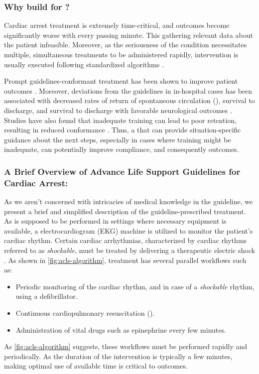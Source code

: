 \subsubsection{Why build \CDSSs{} for \ACLS{}?}

Cardiac arrest treatment is extremely time-critical, and outcomes
become significantly worse with every passing minute. This
gathering relevant data about the patient infeasible. Moreover, as
the seriousness of the condition necessitates multiple, simultaneous treatments
to be administered rapidly, intervention is usually executed following
standardized \ACLS{} algorithms \cite{ACLSWikiEntry}.

Prompt \ACLS{} guidelines-conformant treatment has been
shown to improve patient outcomes \cite{HonarmandResuscitation18}.
Moreover, deviations from the guidelines in in-hospital cases has been
associated with decreased rates of return of spontaneous circulation (\ROSC{}),
survival to discharge, and survival to discharge with favorable neurological
outcomes \cite{CrowleyResuscitation20}. Studies have also found that
inadequate \ACLS{} training can lead to poor retention, resulting
in reduced \ACLS{} conformance \cite{KiddJCN07}. Thus,
a \CDSS{} that can provide situation-specific guidance about
the next steps, especially in cases where \HCP{} training might be inadequate,
can potentially improve compliance, and consequently outcomes.

\subsubsection{A Brief Overview of Advance Life Support Guidelines for Cardiac Arrest:}

As we aren't concerned with intricacies of medical knowledge in the guideline,
we present a brief and simplified description of the guideline-prescribed treatment.
As \ACLS{} is supposed to be performed in settings where necessary equipment is
available, a electrocardiogram (EKG) machine is utilized to
monitor the patient's cardiac rhythm. Certain cardiac arrhythmias, characterized
by cardiac rhythms referred to as \emph{shockable}, must be treated
by delivering a therapeutic electric shock
\cite{DefibrillationWikiEntry}. As shown in \autoref{fig:acls-algorithm},
treatment has several parallel workflows such as:
\begin{itemize}
  \item Periodic monitoring of the cardiac rhythm, and in case of a
    \emph{shockable} rhythm, using a defibrillator.
  \item Continuous cardiopulmonary resuscitation (\CPR{}).
  \item Administration of vital drugs such as
    epinephrine every few minutes.
\end{itemize}
As \autoref{fig:acls-algorithm} suggests, these workflows must be
performed rapidly and periodically. As the duration of the intervention
is typically a few minutes, making optimal use of available time is critical to
outcomes.

